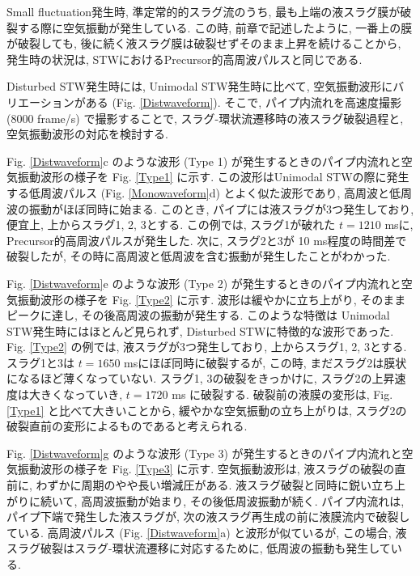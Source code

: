 \documentclass[12pt]{article}
\begin{document}
Small fluctuation発生時, 準定常的的スラグ流のうち, 最も上端の液スラグ膜が破裂する際に空気振動が発生している. この時, 前章で記述したように, 一番上の膜が破裂しても, 後に続く液スラグ膜は破裂せずそのまま上昇を続けることから, 発生時の状況は, STWにおけるPrecursor的高周波パルスと同じである.

Disturbed STW発生時には, Unimodal STW発生時に比べて, 空気振動波形にバリエーションがある (Fig. \ref{Distwaveform}). そこで, パイプ内流れを高速度撮影 (8000 frame/s) で撮影することで, スラグ-環状流遷移時の液スラグ破裂過程と, 空気振動波形の対応を検討する.

Fig. \ref{Distwaveform}c のような波形 (Type 1) が発生するときのパイプ内流れと空気振動波形の様子を Fig. \ref{Type1} に示す. この波形はUnimodal STWの際に発生する低周波パルス (Fig. \ref{Monowaveform}d) とよく似た波形であり, 高周波と低周波の振動がほぼ同時に始まる. このとき, パイプには液スラグが3つ発生しており, 便宜上, 上からスラグ1, 2, 3とする. この例では, スラグ1が破れた $t=1210$ msに, Precursor的高周波パルスが発生した. 次に, スラグ2と3が 10 ms程度の時間差で破裂したが, その時に高周波と低周波を含む振動が発生したことがわかった.

Fig. \ref{Distwaveform}e のような波形 (Type 2) が発生するときのパイプ内流れと空気振動波形の様子を Fig. \ref{Type2} に示す. 波形は緩やかに立ち上がり, そのままピークに達し, その後高周波の振動が発生する. このような特徴は Unimodal STW発生時にはほとんど見られず, Disturbed STWに特徴的な波形であった. Fig. \ref{Type2} の例では, 液スラグが3つ発生しており, 上からスラグ1, 2, 3とする. スラグ1と3は $t=1650$ msにほぼ同時に破裂するが, この時, まだスラグ2は膜状になるほど薄くなっていない. スラグ1, 3の破裂をきっかけに, スラグ2の上昇速度は大きくなっていき, $t=1720$ ms に破裂する. 破裂前の液膜の変形は, Fig. \ref{Type1} と比べて大きいことから, 緩やかな空気振動の立ち上がりは, スラグ2の破裂直前の変形によるものであると考えられる.

Fig. \ref{Distwaveform}g のような波形 (Type 3) が発生するときのパイプ内流れと空気振動波形の様子を Fig. \ref{Type3} に示す. 空気振動波形は, 液スラグの破裂の直前に, わずかに周期のやや長い増減圧がある. 液スラグ破裂と同時に鋭い立ち上がりに続いて, 高周波振動が始まり, その後低周波振動が続く. パイプ内流れは, パイプ下端で発生した液スラグが, 次の液スラグ再生成の前に液膜流内で破裂している. 高周波パルス (Fig. \ref{Distwaveform}a) と波形が似ているが, この場合, 液スラグ破裂はスラグ-環状流遷移に対応するために, 低周波の振動も発生している.


\clearpage
\end{document}
